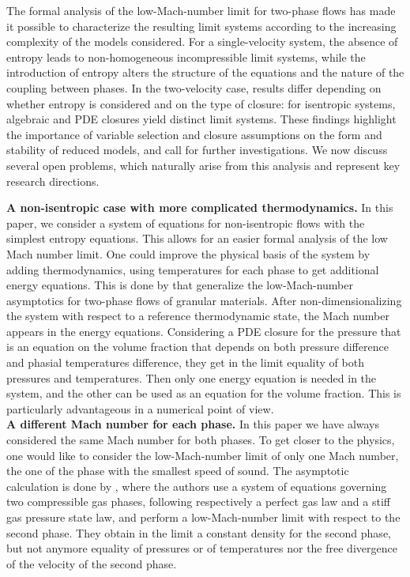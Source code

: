 \documentclass[11pt, twoside, a4paper]{article}
\theoremstyle{plain}
\theoremstyle{remark}
\numberwithin{equation}{section}
\begin{document}
The formal analysis of the low-Mach-number limit for two-phase flows has made it possible to characterize the resulting limit systems according to the increasing complexity of the models considered. For a single-velocity system, the absence of entropy leads to non-homogeneous incompressible limit systems, while the introduction of entropy alters the structure of the equations and the nature of the coupling between phases. In the two-velocity case, results differ depending on whether entropy is considered and on the type of closure: for isentropic systems, algebraic and PDE closures yield distinct limit systems. These findings highlight the importance of variable selection and closure assumptions on the form and stability of reduced models, and call for further investigations. We now discuss several open problems, which naturally arise from this analysis and represent key research directions.

\textbf{A non-isentropic case with more complicated thermodynamics.} In this paper, we consider a system of equations for non-isentropic flows with the simplest entropy equations. This allows for an easier formal analysis of the low Mach number limit. One could improve the physical basis of the system by adding thermodynamics, using temperatures for each phase to get additional energy equations. This is done by \cite{varsakelis2011low} that generalize the low-Mach-number asymptotics for two-phase flows of granular materials. After non-dimensionalizing the system with respect to a reference thermodynamic state, the Mach number appears in the energy equations. Considering a PDE closure for the pressure that is an equation on the volume fraction that depends on both pressure difference and phasial temperatures difference, they get in the limit equality of both pressures and temperatures. Then only one energy equation is needed in the system, and the other can be used as an equation for the volume fraction. This is particularly advantageous in a numerical point of view.\\

\textbf{A different Mach number for each phase.} In this paper we have always considered the same Mach number for both phases. To get closer to the physics, one would like to consider the low-Mach-number limit of only one Mach number, the one of the phase with the smallest speed of sound. The asymptotic calculation is done by \cite{narbona2024two}, where the authors use a system of equations governing two compressible gas phases, following respectively a perfect gas law and a stiff gas pressure state law, and perform a low-Mach-number limit with respect to the second phase. They obtain in the limit a constant density for the second phase, but not anymore equality of pressures or of temperatures nor the free divergence of the velocity of the second phase.\\
\end{document}
